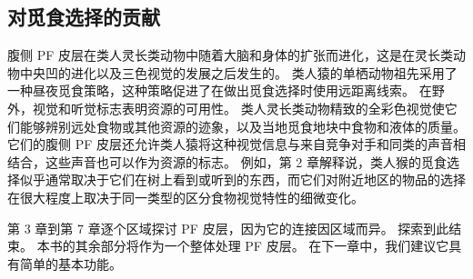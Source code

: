 \subsection{对觅食选择的贡献}
\par 
腹侧 PF 皮层在类人灵长类动物中随着大脑和身体的扩张而进化，这是在灵长类动物中央凹的进化以及三色视觉的发展之后发生的。 
类人猿的单栖动物祖先采用了一种昼夜觅食策略，这种策略促进了在做出觅食选择时使用远距离线索。 
在野外，视觉和听觉标志表明资源的可用性。 
类人灵长类动物精致的全彩色视觉使它们能够辨别远处食物或其他资源的迹象，以及当地觅食地块中食物和液体的质量。 
它们的腹侧 PF 皮层还允许类人猿将这种视觉信息与来自竞争对手和同类的声音相结合，这些声音也可以作为资源的标志。 
例如，第 2 章解释说，类人猴的觅食选择似乎通常取决于它们在树上看到或听到的东西，而它们对附近地区的物品的选择在很大程度上取决于同一类型的区分食物视觉特性的细微变化。 
\par 
第 3 章到第 7 章逐个区域探讨 PF 皮层，因为它的连接因区域而异。
探索到此结束。
本书的其余部分将作为一个整体处理 PF 皮层。 
在下一章中，我们建议它具有简单的基本功能。

